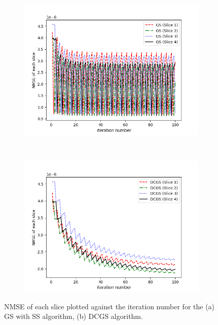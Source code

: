 \begin{figure}[H]
	\centering
	\begin{subfigure}[t]{0.8\textwidth}
		\centering
		\includegraphics[trim={20 5 40 40}, clip, width=\textwidth]{ss/Each_slice_GS.png}
		\caption{}
		\label{fig:SS_Each_slice_GS}
	\end{subfigure}
	\\
	\begin{subfigure}[t]{0.8\textwidth}
		\centering
		\includegraphics[trim={20 5 40 40}, clip, width=\textwidth]{ss/Each_slice_DCGS.png}
		\caption{}
		\label{fig:SS_Each_slice_DCGS}
	\end{subfigure}
	\caption{NMSE of each slice plotted against the iteration number for the (a) GS with SS algorithm, (b) DCGS algorithm.}
	\label{fig:SS_Each_slice_GS_DCGS}
\end{figure}

